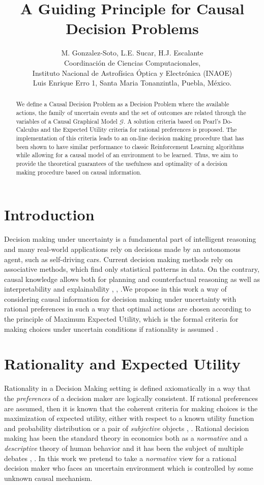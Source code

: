 \documentclass[letterpaper]{article}
\title{A Guiding Principle for Causal Decision Problems}
\author{M. Gonzalez-Soto, L.E. Sucar, H.J. Escalante\\
Coordinaci\'on de Ciencias Computacionales,\\
Instituto Nacional de Astrof\'isica \'Optica y Electr\'onica (INAOE)\\
Luis Enrique Erro 1, Santa Maria Tonanzintla, Puebla, M\'exico.
}
\theoremstyle{plain}
\begin{document}
\maketitle
\begin{abstract}
We define a Causal Decision Problem as a Decision Problem where the available actions, the family of uncertain events and the set of outcomes are related through the variables of a Causal Graphical Model $\mathcal{G}$. A solution criteria based on Pearl's Do-Calculus and the Expected Utility criteria for rational preferences is proposed. The implementation of this criteria leads to an on-line decision making procedure that has been shown to have similar performance to classic Reinforcement Learning algorithms while allowing for a causal model of an environment to be learned. Thus, we aim to provide the theoretical guarantees of the usefulness and optimality of a decision making procedure based on causal information.
\end{abstract}

\section{Introduction}
Decision making under uncertainty is a fundamental part of intelligent reasoning \cite{lake2017building} and many real-world applications rely on decisions made by an autonomous agent, such as self-driving cars. Current decision making methods rely on associative methods, which find only statistical patterns in data. On the contrary, causal knowledge allows both for planning and counterfactual reasoning as well as interpretability and explainability \cite{spirtes2000causation}, \cite{woodward2005making}, \cite{pearl2018why}.We propose in this work a way of considering causal information for decision making under uncertainty with rational preferences in such a way that optimal actions are chosen according to the principle of Maximum Expected Utility, which is the formal criteria for making choices under uncertain conditions if rationality is assumed \cite{bernardo2000bayesian}.

\section{Rationality and Expected Utility}
Rationality in a Decision Making setting is defined axiomatically in a way that the \textit{preferences} of a decision maker are logically consistent. If rational preferences are assumed, then it is known that the coherent criteria for making choices is the maximization of expected utility, either with respect to a known utility function and probability distribution or a pair of \textit{subjective} objects \cite{bernardo2000bayesian}, \cite{gilboa2009decision}. Rational decision making has been the standard theory in economics both as a \textit{normative} and a \textit{descriptive} theory of human behavior and it has been the subject of multiple debates \cite{tversky1974judgment}, \cite{kahneman1982judgment}. In this work we pretend to take a \textit{normative} view for a rational decision maker who faces an uncertain environment which is controlled by some unknown causal mechanism.
\end{document}

